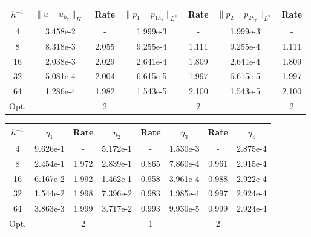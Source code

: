 \begin{center} 
\centering
\begin{tabular}{c|c|c|c|c|c|c}
$h^{-1}$ & $\|u - u_{h_{\tau}}\|_{H^1}$ & Rate & $\|p_1 - p_{1h_{\tau}}\|_{L^2}$ & Rate & $\|p_2 - p_{2h_{\tau}}\|_{L^2}$ & Rate\\\hline
4  & 3.458e-2 & -     & 1.999e-3 & -     & 1.999e-3 & - \\
8  & 8.318e-3 & 2.055 & 9.255e-4 & 1.111 & 9.255e-4 & 1.111 \\
16 & 2.038e-3 & 2.029 & 2.641e-4 & 1.809 & 2.641e-4 & 1.809 \\
32 & 5.081e-4 & 2.004 & 6.615e-5 & 1.997 & 6.615e-5 & 1.997 \\
64 & 1.286e-4 & 1.982 & 1.543e-5 & 2.100 & 1.543e-5 & 2.100 \\\hline
Opt. & & 2 & & 2 & & 2
\end{tabular}
 \label{tab:bb_no_transfer_space_error}
\end{center}
\begin{center} 
\centering
\begin{tabular}{c|c|c|c|c|c|c|c}
$h^{-1}$ & $\eta_1$ & Rate &  $\eta_2$ & Rate & $\eta_3$ & Rate & $\eta_4$\\\hline
4  & 9.626e-1 & -     & 5.172e-1 & -     & 1.530e-3 & -     & 2.875e-4 \\
8  & 2.454e-1 & 1.972 & 2.839e-1 & 0.865 & 7.860e-4 & 0.961 & 2.915e-4 \\
16 & 6.167e-2 & 1.992 & 1.462e-1 & 0.958 & 3.961e-4 & 0.988 & 2.922e-4 \\
32 & 1.544e-2 & 1.998 & 7.396e-2 & 0.983 & 1.985e-4 & 0.997 & 2.924e-4 \\
64 & 3.863e-3 & 1.999 & 3.717e-2 & 0.993 & 9.930e-5 & 0.999 & 2.924e-4 \\\hline
Opt. & & 2 & & 1  & & 2 & 
\end{tabular}
 \label{tab:bb_no_transfer_space_est}
\end{center}

